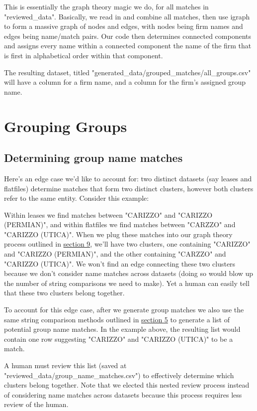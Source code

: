 \documentclass{article}
\begin{document}
This is essentially the graph theory magic we do, for all matches in "reviewed\_data". Basically, we read in and combine all matches, then use igraph to form a massive graph of nodes and edges, with nodes being firm names and edges being name/match pairs. Our code then determines connected components and assigns every name within a connected component the name of the firm that is first in alphabetical order within that component. 

The resulting dataset, titled "generated\_data/grouped\_matches/all\_groups.csv" will have a column for a firm name, and a column for the firm's assigned group name. 

\section{Grouping Groups}

\subsection{Determining group name matches}

Here's an edge case we'd like to account for: two distinct datasets (say leases and flatfiles) determine matches that form two distinct clusters, however both clusters refer to the same entity. Consider this example:

Within leases we find matches between "CARIZZO" and "CARIZZO (PERMIAN)", and within flatfiles we find matches between "CARZZO" and "CARIZZO (UTICA)". When we plug these matches into our graph theory process outlined in  \hyperref[sec:graph-theory]{section 9}, we'll have two clusters, one containing "CARIZZO" and "CARIZZO (PERMIAN)", and the other containing "CARZZO" and "CARIZZO (UTICA)". We won't find an edge connecting these two clusters because we don't consider name matches across datasets (doing so would blow up the number of string comparisons we need to make). Yet a human can easily tell that these two clusters belong together.

To account for this edge case, after we generate group matches we also use the same string comparison methods outlined in \hyperref[sec:matching]{section 5} to generate a list of potential group name matches. In the example above, the resulting list would contain one row suggesting "CARIZZO" and "CARIZZO (UTICA)" to be a match. 

A human must review this list (saved at "reviewed\_data/group\_name\_matches.csv") to effectively determine which clusters belong together. Note that we elected this nested review process instead of considering name matches across datasets because this process requires less review of the human. 
\end{document}
